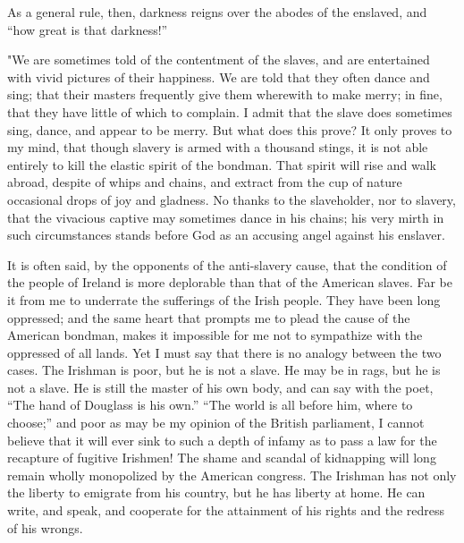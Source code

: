 As a general rule, then, darkness reigns over the abodes of the
enslaved, and ``how great is that darkness!''

"We are sometimes told of the contentment of the slaves, and are
{\protect\hypertarget{433}{}{}}entertained with vivid pictures of their
happiness. We are told that they often dance and sing; that their
masters frequently give them wherewith to make merry; in fine, that they
have little of which to complain. I admit that the slave does sometimes
sing, dance, and appear to be merry. But what does this prove? It only
proves to my mind, that though slavery is armed with a thousand stings,
it is not able entirely to kill the elastic spirit of the bondman. That
spirit will rise and walk abroad, despite of whips and chains, and
extract from the cup of nature occasional drops of joy and gladness. No
thanks to the slaveholder, nor to slavery, that the vivacious captive
may sometimes dance in his chains; his very mirth in such circumstances
stands before God as an accusing angel against his enslaver.

It is often said, by the opponents of the anti-slavery cause, that the
condition of the people of Ireland is more deplorable than that of the
American slaves. Far be it from me to underrate the sufferings of the
Irish people. They have been long oppressed; and the same heart that
prompts me to plead the cause of the American bondman, makes it
impossible for me not to sympathize with the oppressed of all lands. Yet
I must say that there is no analogy between the two cases. The Irishman
is poor, but he is not a slave. He may be in rags, but he is not a
slave. He is still the master of his own body, and can say with the
poet, ``The hand of Douglass is his own.'' ``The world is all before
him, where to choose;'' and poor as may be my opinion of the British
parliament, I cannot believe that it will ever sink to such a depth of
infamy as to pass a law for the recapture of fugitive Irishmen! The
shame and scandal of kidnapping will long remain wholly monopolized by
the American congress. The Irishman has not only the liberty to emigrate
from his country, but he has liberty at home. He can write, and speak,
and cooperate for the attainment of his rights and the redress of his
wrongs.

